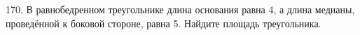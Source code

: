170. В равнобедренном треугольнике длина основания равна 4, а длина медианы, проведённой к боковой стороне, равна 5. Найдите площадь треугольника.\\
